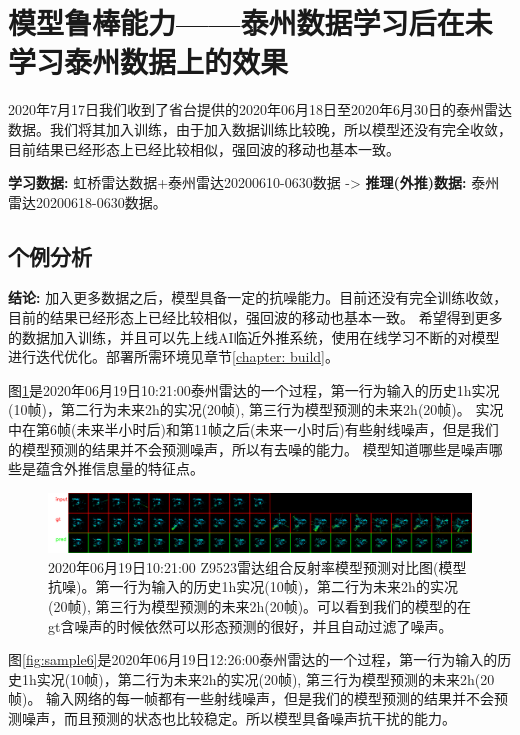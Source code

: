 \documentclass[10pt,english, openany]{book}
\begin{document}
\section{模型鲁棒能力——泰州数据学习后在未学习泰州数据上的效果}

2020年7月17日我们收到了省台提供的2020年06月18日至2020年6月30日的泰州雷达数据。我们将其加入训练，由于加入数据训练比较晚，所以模型还没有完全收敛，
目前结果已经形态上已经比较相似，强回波的移动也基本一致。

\textbf{学习数据:} 虹桥雷达数据+泰州雷达20200610-0630数据 -> \textbf{推理(外推)数据:} 泰州雷达20200618-0630数据。

\subsection{个例分析}

\textbf{结论:} 加入更多数据之后，模型具备一定的抗噪能力。目前还没有完全训练收敛，目前的结果已经形态上已经比较相似，强回波的移动也基本一致。
希望得到更多的数据加入训练，并且可以先上线AI临近外推系统，使用在线学习不断的对模型进行迭代优化。部署所需环境见章节\ref{chapter: build}。

图\ref{fig:sample5}是2020年06月19日10:21:00泰州雷达的一个过程，第一行为输入的历史1h实况(10帧)，第二行为未来2h的实况(20帧), 第三行为模型预测的未来2h(20帧)。
实况中在第6帧(未来半小时后)和第11帧之后(未来一小时后)有些射线噪声，但是我们的模型预测的结果并不会预测噪声，所以有去噪的能力。
模型知道哪些是噪声哪些是蕴含外推信息量的特征点。

\begin{figure}
	\centering
	\centering \includegraphics[scale=0.18]{Z_RADR_I_Z9523_20200619102100_O_DOR_SA_CAP.png}
	\caption{2020年06月19日10:21:00 Z9523雷达组合反射率模型预测对比图(模型抗噪)。第一行为输入的历史1h实况(10帧)，第二行为未来2h的实况(20帧), 第三行为模型预测的未来2h(20帧)。可以看到我们的模型的在gt含噪声的时候依然可以形态预测的很好，并且自动过滤了噪声。}
	\label{fig:sample5}
\end{figure}

图\ref{fig:sample6}是2020年06月19日12:26:00泰州雷达的一个过程，第一行为输入的历史1h实况(10帧)，第二行为未来2h的实况(20帧), 第三行为模型预测的未来2h(20帧)。
输入网络的每一帧都有一些射线噪声，但是我们的模型预测的结果并不会预测噪声，而且预测的状态也比较稳定。所以模型具备噪声抗干扰的能力。
\end{document}
